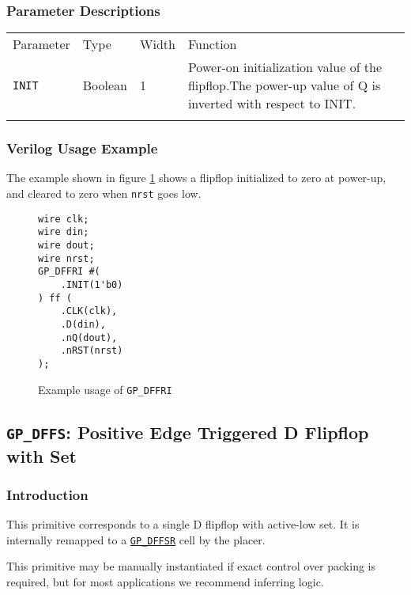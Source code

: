 \documentclass[11pt]{article}
\newcommand{\tokenstyle}[1]{\texttt{#1}}
\newcommand{\wirestyle}[1]{\texttt{#1}}
\newcommand{\whenstyle}[1]{{\fontseries{sb}\selectfont#1}}
\newcommand{\tokenref}[2]{\hyperref[#2]{\tokenstyle{#1}}}
\newcommand{\thinhline}{\Xhline{1\arrayrulewidth}}
\newcommand{\thickhline}{\Xhline{2.5\arrayrulewidth}}
\begin{document}
\subsubsection{Parameter Descriptions}

\begin{tabularx}{\textwidth}{lllX}
\thinhline
\whenstyle{Parameter} & \whenstyle{Type} & \whenstyle{Width} & \whenstyle{Function} \\
\thickhline
\tokenstyle{INIT} & Boolean & 1 & Power-on initialization value of the flipflop.\newline The power-up value of Q is inverted
with respect to INIT.\\
\thinhline
\end{tabularx}

\subsubsection{Verilog Usage Example}

The example shown in figure \ref{gp-dffri-example} shows a flipflop initialized to zero at power-up, and cleared to zero
when \wirestyle{nrst} goes low.

\begin{figure}[h]
\begin{lstlisting}
wire clk;
wire din;
wire dout;
wire nrst;
GP_DFFRI #(
	.INIT(1'b0)
) ff (
	.CLK(clk),
	.D(din),
	.nQ(dout),
	.nRST(nrst)
);
\end{lstlisting}
\caption{Example usage of \tokenstyle{GP\_DFFRI}}
\label{gp-dffri-example}
\end{figure}


\pagebreak
\subsection{\tokenstyle{GP\_DFFS}: Positive Edge Triggered D Flipflop with Set}
\label{gp-dffs}

\subsubsection{Introduction}
This primitive corresponds to a single D flipflop with active-low set. It is internally remapped to a
\tokenref{GP\_DFFSR}{gp-dffsr} cell by the placer.

This primitive may be manually instantiated if exact control over packing is required, but for most applications we
recommend inferring logic.
\end{document}
